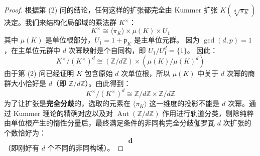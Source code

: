 \documentclass[]{article}
\begin{document}
\begin{enumerate}[label=(\arabic*)]
		\begin{proof}
			根据第 (2) 问的结论，任何这样的扩张都完全由 Kummer 扩张 $K(\sqrt[d]{\pi_K})$ 决定。我们来结构化局部域的乘法群 $K^\times$：
			\[ K^\times \cong \langle \pi_K \rangle \times \mu(K) \times U_1 \]
			其中 $\mu(K)$ 是单位根部分，$U_1 = 1 + \mathfrak{p}_K$ 是主单位元群。
			因为 $\gcd(d,p)=1$，在主单位元群中 $d$ 次幂映射是个自同构，即 $U_1 / U_1^d = \{1\}$。
			因此：
			\[ K^\times / (K^\times)^d \cong (\mathbb{Z}/d\mathbb{Z}) \times (\mu(K) / \mu(K)^d) \]
			由于第 (2) 问已经证明 $K$ 包含原始 $d$ 次单位根，所以 $\mu(K)$ 中关于 $d$ 次幂的商群大小恰好是 $d$（即 $\mathbb{Z}/d\mathbb{Z}$）。由此得到：
			\[ K^\times / (K^\times)^d \cong \mathbb{Z}/d\mathbb{Z} \times \mathbb{Z}/d\mathbb{Z} \]
			为了让扩张是\textbf{完全分歧}的，选取的元素在 $\langle \pi_K \rangle$ 这一维度的投影不能是 $d$ 次幂。通过 Kummer 理论的精确对应以及对 $\operatorname{Aut}(\mathbb{Z}/d\mathbb{Z})$ 作用进行轨道分类，剔除纯粹由单位根产生的惰性分量后，最终满足条件的非同构完全分歧伽罗瓦 $d$ 次扩张的个数恰好为：
			\[ \mathbf{d} \]
			（即刚好有 $d$ 个不同的非同构域）。
		\end{proof}
	\end{enumerate}
	

	
\end{document}
